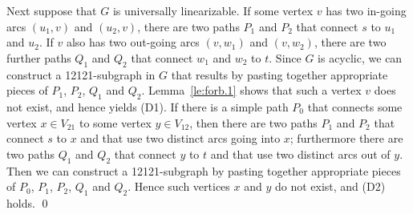 Next suppose that $G$ is universally linearizable.
If some vertex $v$ has two in-going arcs $(u_1,v)$ and $(u_2,v)$, there are two 
paths $P_1$ and $P_2$ that connect $s$ to $u_1$ and $u_2$.
If $v$ also has two out-going arcs $(v,w_1)$ and $(v,w_2)$, there are two further
paths $Q_1$ and $Q_2$ that connect $w_1$ and $w_2$ to $t$.
Since $G$ is acyclic, we can construct a 12121-subgraph in $G$ that results by pasting together 
appropriate pieces of $P_1$, $P_2$, $Q_1$ and $Q_2$.
Lemma~\ref{le:forb.1} shows that such a vertex $v$ does not exist, and hence yields (D1).
If there is a simple path $P_0$ that connects some vertex $x\in V_{21}$ to some vertex $y\in V_{12}$,
then there are two paths $P_1$ and $P_2$ that connect $s$ to $x$ and that use two distinct 
arcs going into $x$; furthermore there are two paths $Q_1$ and $Q_2$ that connect $y$ to $t$ and 
that use two distinct arcs out of $y$.
Then we can construct a 12121-subgraph by pasting together appropriate pieces of 
$P_0$, $P_1$, $P_2$, $Q_1$ and $Q_2$.
Hence such vertices $x$ and $y$ do not exist, and (D2) holds.
\qed


